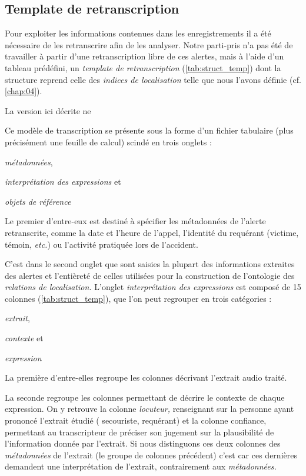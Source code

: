 \subsection{Template de retranscription}

Pour exploiter les informations contenues dans les enregistrements il
a été nécessaire de les retranscrire afin de les analyser.
%
Notre parti-pris n'a pas été de travailler à partir d'une
retranscription libre de ces alertes, mais à l'aide d'un tableau
prédéfini, un \emph{template de retranscription}
(\autoref{tab:struct_temp}) dont la structure reprend celle des
\emph{indices de localisation} telle que nous l'avons définie
(cf. \autoref{chap:04}).

La version ici décrite ne 

Ce modèle de transcription se présente sous la forme d'un fichier
tabulaire (plus précisément une feuille de calcul) scindé en trois
onglets :
%
\begin{enumerate*}[label=(\alph*)]
\item \emph{métadonnées},
\item \emph{interprétation des expressions} et
\item \emph{objets de référence}
\end{enumerate*}
%
Le premier d'entre-eux est destiné à spécifier les métadonnées de
l'alerte retranscrite, comme la date et l'heure de l'appel, l'identité
du requérant (\eg victime, témoin, \emph{etc.}) ou l’activité
pratiquée lors de l'accident.

C'est dans le second onglet que sont saisies la plupart des
informations extraites des alertes et l’entièreté de celles utilisées
pour la construction de l'ontologie des \emph{relations de
  localisation.} L'onglet \emph{interprétation des expressions} est
composé de 15 colonnes (\autoref{tab:struct_temp}), que l'on peut
regrouper en trois catégories :
%
\begin{enumerate*}[label=(\alph*)]
\item \emph{extrait},
\item \emph{contexte} et
\item \emph{expression}
\end{enumerate*}
%
La première d'entre-elles regroupe les colonnes décrivant l'extrait
audio traité.

La seconde regroupe les colonnes permettant de décrire le contexte de
chaque expression. On y retrouve la colonne \emph{locuteur,}
renseignant sur la personne ayant prononcé l'extrait étudié (\eg
secouriste, requérant) et la colonne confiance, permettant au
transcripteur de préciser son jugement sur la plausibilité de
l'information donnée par l'extrait. Si nous distinguons ces deux
colonnes des \emph{métadonnées} de l'extrait (\ie le groupe de
colonnes précédent) c'est car ces dernières demandent une
interprétation de l'extrait, contrairement aux \emph{métadonnées.}

